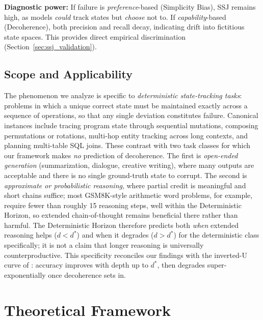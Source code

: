 \documentclass{article}
\theoremstyle{plain}
\theoremstyle{definition}
\theoremstyle{remark}
\begin{document}
\textbf{Diagnostic power:} If failure is \emph{preference}-based (Simplicity Bias), SSJ remains high, as models \emph{could} track states but \emph{choose} not to. If \emph{capability}-based (Decoherence), both precision and recall decay, indicating drift into fictitious state spaces. This provides direct empirical discrimination (Section~\ref{sec:ssj_validation}).

\subsection{Scope and Applicability}
\label{sec:scope}
The phenomenon we analyze is specific to \emph{deterministic state-tracking tasks}: problems in which a unique correct state must be maintained exactly across a sequence of operations, so that any single deviation constitutes failure. Canonical instances include tracing program state through sequential mutations, composing permutations or rotations, multi-hop entity tracking across long contexts, and planning multi-table SQL joins. These contrast with two task classes for which our framework makes \emph{no} prediction of decoherence. The first is \emph{open-ended generation} (summarization, dialogue, creative writing), where many outputs are acceptable and there is no single ground-truth state to corrupt. The second is \emph{approximate or probabilistic reasoning}, where partial credit is meaningful and short chains suffice; most GSM8K-style arithmetic word problems, for example, require fewer than roughly 15 reasoning steps, well within the Deterministic Horizon, so extended chain-of-thought remains beneficial there rather than harmful. The Deterministic Horizon therefore predicts both \emph{when} extended reasoning helps ($d < d^*$) and when it degrades ($d > d^*$) for the deterministic class specifically; it is not a claim that longer reasoning is universally counterproductive. This specificity reconciles our findings with the inverted-U curve of \citet{wu2025more}: accuracy improves with depth up to $d^*$, then degrades super-exponentially once decoherence sets in.


\section{Theoretical Framework}
\label{sec:theory}
\end{document}

